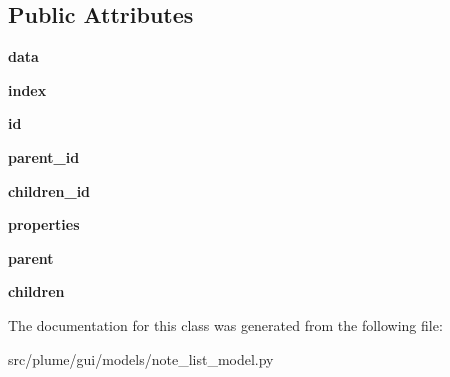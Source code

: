 \subsection*{Public Attributes}
\begin{DoxyCompactItemize}
\item 
{\bfseries data}\hypertarget{classplume-creator_1_1src_1_1plume_1_1gui_1_1models_1_1note__list__model_1_1_list_item_ac1858fb36d1e5623fc37ccf5c0531d4d}{}\label{classplume-creator_1_1src_1_1plume_1_1gui_1_1models_1_1note__list__model_1_1_list_item_ac1858fb36d1e5623fc37ccf5c0531d4d}

\item 
{\bfseries index}\hypertarget{classplume-creator_1_1src_1_1plume_1_1gui_1_1models_1_1note__list__model_1_1_list_item_a7dc551117aca53cb6435f50b3c7e921c}{}\label{classplume-creator_1_1src_1_1plume_1_1gui_1_1models_1_1note__list__model_1_1_list_item_a7dc551117aca53cb6435f50b3c7e921c}

\item 
{\bfseries id}\hypertarget{classplume-creator_1_1src_1_1plume_1_1gui_1_1models_1_1note__list__model_1_1_list_item_a3a558d6d1aa90af61a9e52f862bbf5e7}{}\label{classplume-creator_1_1src_1_1plume_1_1gui_1_1models_1_1note__list__model_1_1_list_item_a3a558d6d1aa90af61a9e52f862bbf5e7}

\item 
{\bfseries parent\+\_\+id}\hypertarget{classplume-creator_1_1src_1_1plume_1_1gui_1_1models_1_1note__list__model_1_1_list_item_a1ea5c15e598b277382d04e863056b908}{}\label{classplume-creator_1_1src_1_1plume_1_1gui_1_1models_1_1note__list__model_1_1_list_item_a1ea5c15e598b277382d04e863056b908}

\item 
{\bfseries children\+\_\+id}\hypertarget{classplume-creator_1_1src_1_1plume_1_1gui_1_1models_1_1note__list__model_1_1_list_item_ae0b035cc23408510ce11f7c6017b4941}{}\label{classplume-creator_1_1src_1_1plume_1_1gui_1_1models_1_1note__list__model_1_1_list_item_ae0b035cc23408510ce11f7c6017b4941}

\item 
{\bfseries properties}\hypertarget{classplume-creator_1_1src_1_1plume_1_1gui_1_1models_1_1note__list__model_1_1_list_item_a49df305df805d59ca40338715b7bb341}{}\label{classplume-creator_1_1src_1_1plume_1_1gui_1_1models_1_1note__list__model_1_1_list_item_a49df305df805d59ca40338715b7bb341}

\item 
{\bfseries parent}\hypertarget{classplume-creator_1_1src_1_1plume_1_1gui_1_1models_1_1note__list__model_1_1_list_item_a7b44031348c5eebff7e3745181300cca}{}\label{classplume-creator_1_1src_1_1plume_1_1gui_1_1models_1_1note__list__model_1_1_list_item_a7b44031348c5eebff7e3745181300cca}

\item 
{\bfseries children}\hypertarget{classplume-creator_1_1src_1_1plume_1_1gui_1_1models_1_1note__list__model_1_1_list_item_a6936c96c6da2456addd373ad286330f5}{}\label{classplume-creator_1_1src_1_1plume_1_1gui_1_1models_1_1note__list__model_1_1_list_item_a6936c96c6da2456addd373ad286330f5}

\end{DoxyCompactItemize}


The documentation for this class was generated from the following file\+:\begin{DoxyCompactItemize}
\item 
src/plume/gui/models/note\+\_\+list\+\_\+model.\+py\end{DoxyCompactItemize}

